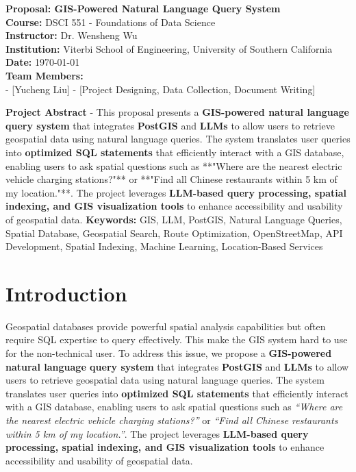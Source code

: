 \documentclass{article}
\begin{document}
\begin{titlepage}
    \centering
    \vspace*{2cm}
    {\Huge \textbf{Proposal: GIS-Powered Natural Language Query System}} \\
    \vspace{1.5cm}
    \textbf{Course:} DSCI 551 - Foundations of Data Science \\
    \textbf{Instructor:} Dr. Wensheng Wu \\
    \textbf{Institution:} Viterbi School of Engineering, University of Southern California \\
    \textbf{Date:} \today \\
    \vfill
    \textbf{Team Members:} \\
    - [Yucheng Liu] - [Project Designing, Data Collection, Document Writing] \\
    \vfill
    \begin{justify}
        \textbf{Project Abstract} - This proposal presents a \textbf{GIS-powered natural language query system} that integrates \textbf{PostGIS} and \textbf{LLMs} to allow users to retrieve geospatial data using natural language queries. The system translates user queries into \textbf{optimized SQL statements} that efficiently interact with a GIS database, enabling users to ask spatial questions such as **"Where are the nearest electric vehicle charging stations?"** or **"Find all Chinese restaurants within 5 km of my location."**. The project leverages \textbf{LLM-based query processing, spatial indexing, and GIS visualization tools} to enhance accessibility and usability of geospatial data.
        \vfill
        \textbf{Keywords:} GIS, LLM, PostGIS, Natural Language Queries, Spatial Database, Geospatial Search, Route Optimization, OpenStreetMap, API Development, Spatial Indexing, Machine Learning, Location-Based Services
    \end{justify}

\end{titlepage}

\section{Introduction}

Geospatial databases provide powerful spatial analysis capabilities but often require SQL expertise to query effectively. This make the GIS system hard to use for the non-technical user. To address this issue, we propose a \textbf{GIS-powered natural language query system} that integrates \textbf{PostGIS} and \textbf{LLMs} to allow users to retrieve geospatial data using natural language queries. The system translates user queries into \textbf{optimized SQL statements} that efficiently interact with a GIS database, enabling users to ask spatial questions such as \textit{``Where are the nearest electric vehicle charging stations?''} or \textit{``Find all Chinese restaurants within 5 km of my location.''}. The project leverages \textbf{LLM-based query processing, spatial indexing, and GIS visualization tools} to enhance accessibility and usability of geospatial data.
\end{document}
